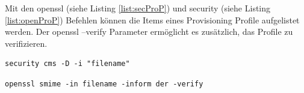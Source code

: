 Mit den \glqq openssl\grqq{} (siehe Listing \ref{list:secProP}) und \glqq security\grqq{} (siehe Listing \ref{list:openProP}) Befehlen können die Items eines Provisioning Profile aufgelistet werden. Der \glqq openssl --verify\grqq{} Parameter ermöglicht es zusätzlich, das Profile zu verifizieren. 
\newline

\lstset{
    language=bash,
    }
\begin{lstlisting}[captionpos=b, caption={Befehl: security}, label=list:secProP]
security cms -D -i "filename" 
\end{lstlisting}

\begin{lstlisting}[captionpos=b, caption={Befehl: openssl -- (siehe Abb.\ref{fig:ProvisioningProfile})}, label=list:openProP]
openssl smime -in filename -inform der -verify
\end{lstlisting}

